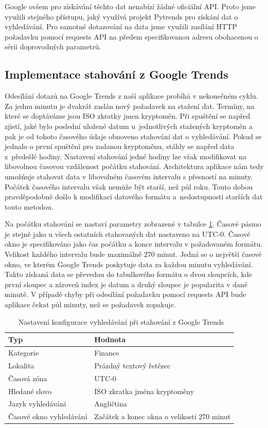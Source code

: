 Google ovšem pro získávání těchto dat nenabízí žádné oficiální API. 
Proto jsme využili stejného přístupu, jaký využívá projekt Pytrends \cite{trend} pro získání dat o vyhledávání. 
Pro samotné dotazování na data jsme využili zasílání HTTP požadavku pomocí requests API na předem specifikovanou adresu obohacenou o sérii doprovodných parametrů.

\subsection{Implementace stahování z Google Trends}

Odesílání dotazů na Google Trends z naší aplikace probíhá v nekonečném cyklu. Za jednu minutu je dvakrát zaslán nový požadavek na stažení dat. 
Termíny, na které se doptáváme jsou ISO zkratky jmen kryptoměn. 
Při spuštění se napřed zjistí, jaké bylo poslední uložené datum u~jednotlivých stažených kryptoměn a pak je od tohoto časového údaje obnoveno stahování dat o vyhledávání. 
Pokud se jednalo o první spuštění pro zadanou kryptoměnu, stáhly se napřed data z~předešlé hodiny. 
Nastavení stahování jedné hodiny lze však modifikovat na libovolnou časovou vzdálenost počátku stahování. 
Architektura aplikace nám tedy umožňuje stahovat data v libovolném časovém intervalu s přesností na minuty.
Počátek časového intervalu však nemůže být starší, než půl roku.
Touto dobou pravděpodobně došlo k modifikaci datového formátu a~nedostupnosti starších dat touto metodou. 

Na počátku stahování se nastaví parametry zobrazené v tabulce \ref{cookie}.
Časové pásmo je stejně jako u všech ostatních stahovaných dat nastaveno na UTC-0.
Časové okno je specifikováno jako čas počátku a konce intervalu v požadovaném formátu.
Velikost každého intervalu bude maximálně 270 minut. 
Jedná se o největší časové okno, ve kterém Google Trends poskytuje data za každou minutu vyhledávání. 
Takto získaná data se převedou do tabulkového formátu o dvou sloupcích, kde první sloupec a zároveň index je datum a druhý sloupec je popularita v dané minutě. 
V případě chyby při odesílání požadavku pomocí requests API bude aplikace čekat půl minuty, než se požadavek zopakuje.

\begin{table}\centering
\caption{~Nastavení konfigurace vyhledávání při stahování z Google Trends}\label{cookie}
\begin{tabular}{l|l}
    Typ & Hodnota	\tabularnewline \hline 
    Kategorie	            & Finance	                \tabularnewline \hline
    Lokalita	            & Prázdný textový řetězec   \tabularnewline \hline
    Časová zóna             & UTC-0                 	\tabularnewline \hline
    Hledané slovo           & ISO zkratka jména kryptoměny	\tabularnewline \hline
    Jazyk vyhledávání       & Angličtina            	\tabularnewline \hline
    Časové okno vyhledávání & Začátek a konec okna o velikosti 270 minut	\tabularnewline
\end{tabular}
\end{table}

